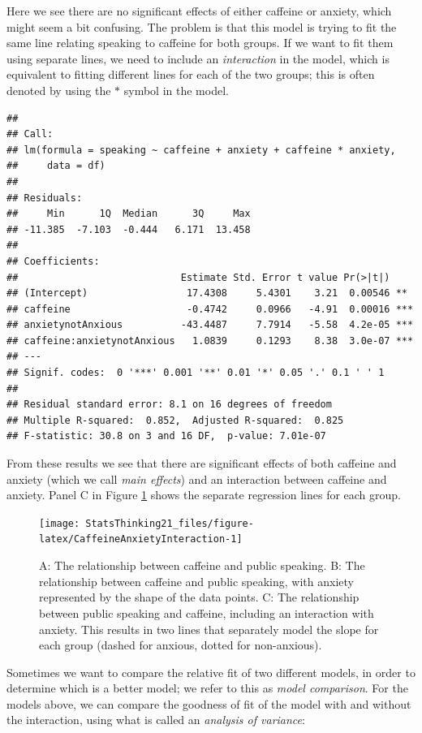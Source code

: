 \documentclass[12pt,]{book}
\theoremstyle{definition}
\theoremstyle{definition}
\theoremstyle{definition}
\theoremstyle{remark}
\begin{document}
Here we see there are no significant effects of either caffeine or anxiety, which might seem a bit confusing. The problem is that this model is trying to fit the same line relating speaking to caffeine for both groups. If we want to fit them using separate lines, we need to include an \emph{interaction} in the model, which is equivalent to fitting different lines for each of the two groups; this is often denoted by using the \(*\) symbol in the model.

\begin{verbatim}
## 
## Call:
## lm(formula = speaking ~ caffeine + anxiety + caffeine * anxiety, 
##     data = df)
## 
## Residuals:
##     Min      1Q  Median      3Q     Max 
## -11.385  -7.103  -0.444   6.171  13.458 
## 
## Coefficients:
##                            Estimate Std. Error t value Pr(>|t|)    
## (Intercept)                 17.4308     5.4301    3.21  0.00546 ** 
## caffeine                    -0.4742     0.0966   -4.91  0.00016 ***
## anxietynotAnxious          -43.4487     7.7914   -5.58  4.2e-05 ***
## caffeine:anxietynotAnxious   1.0839     0.1293    8.38  3.0e-07 ***
## ---
## Signif. codes:  0 '***' 0.001 '**' 0.01 '*' 0.05 '.' 0.1 ' ' 1
## 
## Residual standard error: 8.1 on 16 degrees of freedom
## Multiple R-squared:  0.852,  Adjusted R-squared:  0.825 
## F-statistic: 30.8 on 3 and 16 DF,  p-value: 7.01e-07
\end{verbatim}

From these results we see that there are significant effects of both caffeine and anxiety (which we call \emph{main effects}) and an interaction between caffeine and anxiety. Panel C in Figure \ref{fig:CaffeineAnxietyInteraction} shows the separate regression lines for each group.

\begin{figure}
\texttt{[image: StatsThinking21\_files/figure-latex/CaffeineAnxietyInteraction-1]} \caption{A: The relationship between caffeine and public speaking. B: The relationship between caffeine and public speaking, with anxiety represented by the shape of the data points. C: The relationship between public speaking and caffeine, including an interaction with anxiety.  This results in two lines that separately model the slope for each group (dashed for anxious, dotted for non-anxious).}\label{fig:CaffeineAnxietyInteraction}
\end{figure}

Sometimes we want to compare the relative fit of two different models, in order to determine which is a better model; we refer to this as \emph{model comparison}. For the models above, we can compare the goodness of fit of the model with and without the interaction, using what is called an \emph{analysis of variance}:
\end{document}
